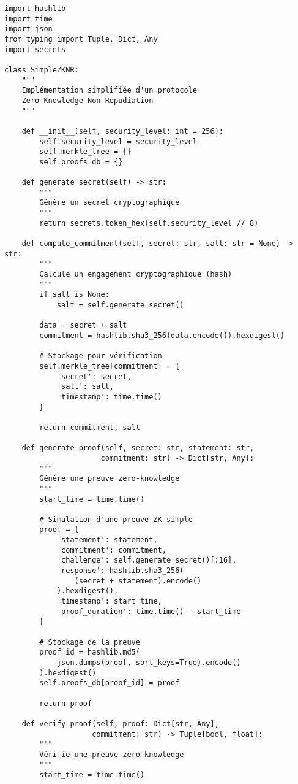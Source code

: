 \documentclass[12pt,a4paper]{article}
\begin{document}
\begin{lstlisting}[caption=Prototype ZK-NR (Zero-Knowledge Non-Repudiation)]
import hashlib
import time
import json
from typing import Tuple, Dict, Any
import secrets

class SimpleZKNR:
    """
    Implémentation simplifiée d'un protocole 
    Zero-Knowledge Non-Repudiation
    """
    
    def __init__(self, security_level: int = 256):
        self.security_level = security_level
        self.merkle_tree = {}
        self.proofs_db = {}
    
    def generate_secret(self) -> str:
        """
        Génère un secret cryptographique
        """
        return secrets.token_hex(self.security_level // 8)
    
    def compute_commitment(self, secret: str, salt: str = None) -> str:
        """
        Calcule un engagement cryptographique (hash)
        """
        if salt is None:
            salt = self.generate_secret()
        
        data = secret + salt
        commitment = hashlib.sha3_256(data.encode()).hexdigest()
        
        # Stockage pour vérification
        self.merkle_tree[commitment] = {
            'secret': secret,
            'salt': salt,
            'timestamp': time.time()
        }
        
        return commitment, salt
    
    def generate_proof(self, secret: str, statement: str, 
                      commitment: str) -> Dict[str, Any]:
        """
        Génère une preuve zero-knowledge
        """
        start_time = time.time()
        
        # Simulation d'une preuve ZK simple
        proof = {
            'statement': statement,
            'commitment': commitment,
            'challenge': self.generate_secret()[:16],
            'response': hashlib.sha3_256(
                (secret + statement).encode()
            ).hexdigest(),
            'timestamp': start_time,
            'proof_duration': time.time() - start_time
        }
        
        # Stockage de la preuve
        proof_id = hashlib.md5(
            json.dumps(proof, sort_keys=True).encode()
        ).hexdigest()
        self.proofs_db[proof_id] = proof
        
        return proof
    
    def verify_proof(self, proof: Dict[str, Any], 
                    commitment: str) -> Tuple[bool, float]:
        """
        Vérifie une preuve zero-knowledge
        """
        start_time = time.time()
        

\end{lstlisting}
\end{document}
